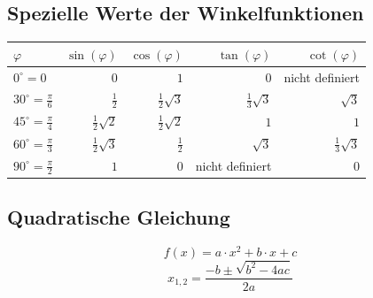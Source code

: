 \subsection{Spezielle Werte der Winkelfunktionen}

\begin{tabular}{|l||r|r|r|r|}
\hline $\varphi$                    &          $\sin(\varphi)$&          $\cos(\varphi)$&          $\tan(\varphi)$&          $\cot(\varphi)$\\
\hline $0^\circ=0$                  &                      $0$&                      $1$&                      $0$&          nicht definiert\\
\hline $30^\circ=\frac{\pi}{6}$     &            $\frac{1}{2}$&    $\frac{1}{2}\sqrt{3}$&    $\frac{1}{3}\sqrt{3}$&               $\sqrt{3}$\\
\hline $45^\circ=\frac{\pi}{4}$     &    $\frac{1}{2}\sqrt{2}$&    $\frac{1}{2}\sqrt{2}$&                      $1$&                      $1$\\
\hline $60^\circ=\frac{\pi}{3}$     &    $\frac{1}{2}\sqrt{3}$&            $\frac{1}{2}$&               $\sqrt{3}$&    $\frac{1}{3}\sqrt{3}$\\
\hline $90^\circ=\frac{\pi}{2}$     &                      $1$&                      $0$&          nicht definiert&                      $0$\\

\hline\end{tabular}


\subsection{Quadratische Gleichung}
\[ \boxed{f(x) = a \cdot x^2 + b \cdot x + c} \]
\[ \boxed{x_{1,2}=\frac{-b\pm\sqrt{b^2-4ac}}{2a}} \]

